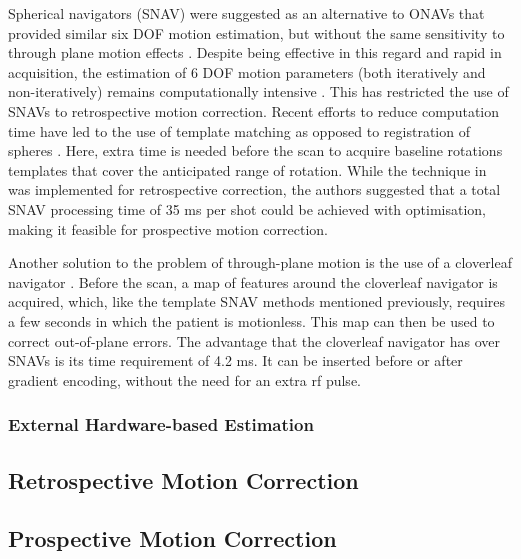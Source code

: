 \documentclass[class=article, crop=false]{standalone}
\begin{document}
\par
Spherical navigators (SNAV) were suggested as an alternative to ONAVs that provided similar six DOF motion estimation, but without the same sensitivity to through plane motion effects \parencite{Welch2001,Petrie2005}. Despite being effective in this regard and rapid in acquisition, the estimation of 6 DOF motion parameters (both iteratively and non-iteratively) remains computationally intensive \parencite{Welch2004,Costa2010,Costa2005}. This has restricted the use of SNAVs to retrospective motion correction. Recent efforts to reduce computation time have led to the use of template matching as opposed to registration of spheres \parencite{Liu2011,Johnson2016}. Here, extra time is needed before the scan to acquire baseline rotations templates that cover the anticipated range of rotation. While the technique in \cite{Johnson2016} was implemented for retrospective correction, the authors suggested that a total SNAV processing time of 35 ms per shot could be achieved with optimisation, making it feasible for prospective motion correction.
\par
Another solution to the problem of through-plane motion is the use of a cloverleaf navigator \parencite{VanDerKouwe2006}. Before the scan, a map of features around the cloverleaf navigator is acquired, which, like the template SNAV methods mentioned previously, requires a few seconds in which the patient is motionless. This map can then be used to correct out-of-plane errors. The advantage that the cloverleaf navigator has over SNAVs is its time requirement of 4.2 ms. It can be inserted before or after gradient encoding, without the need for an extra rf pulse.
 
\subsubsection*{External Hardware-based Estimation}

\subsection{Retrospective Motion Correction}

\subsection{Prospective Motion Correction}
\end{document}
